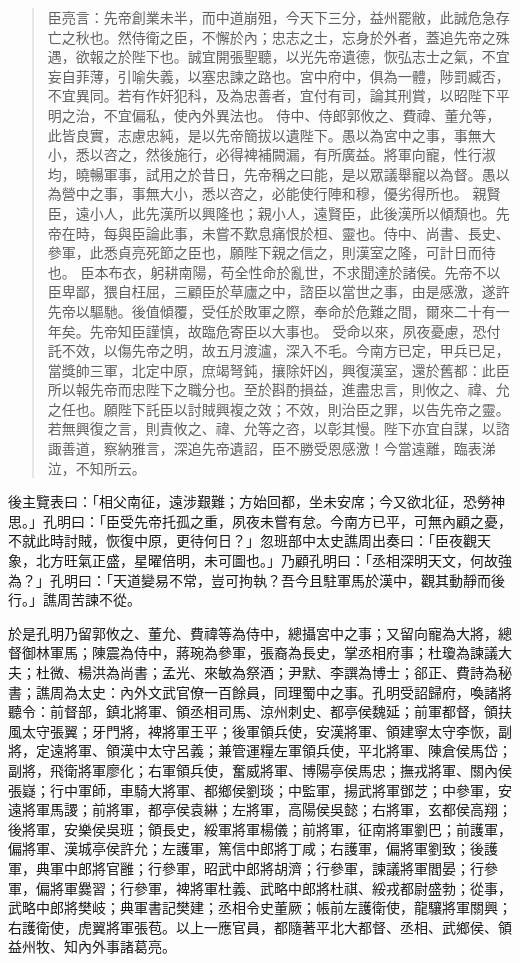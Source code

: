 \begin{quote}
臣亮言：先帝創業未半，而中道崩殂，今天下三分，益州罷敝，此誠危急存亡之秋也。然侍衛之臣，不懈於內；忠志之士，忘身於外者，蓋追先帝之殊遇，欲報之於陛下也。誠宜開張聖聽，以光先帝遺德，恢弘志士之氣，不宜妄自菲薄，引喻失義，以塞忠諫之路也。宮中府中，俱為一體，陟罰臧否，不宜異同。若有作奸犯科，及為忠善者，宜付有司，論其刑賞，以昭陛下平明之治，不宜偏私，使內外異法也。
侍中、侍郎郭攸之、費禕、董允等，此皆良實，志慮忠純，是以先帝簡拔以遺陛下。愚以為宮中之事，事無大小，悉以咨之，然後施行，必得裨補闕漏，有所廣益。將軍向寵，性行淑均，曉暢軍事，試用之於昔日，先帝稱之曰能，是以眾議舉寵以為督。愚以為營中之事，事無大小，悉以咨之，必能使行陣和穆，優劣得所也。
親賢臣，遠小人，此先漢所以興隆也；親小人，遠賢臣，此後漢所以傾頹也。先帝在時，每與臣論此事，未嘗不歎息痛恨於桓、靈也。侍中、尚書、長史、參軍，此悉貞亮死節之臣也，願陛下親之信之，則漢室之隆，可計日而待也。
臣本布衣，躬耕南陽，苟全性命於亂世，不求聞達於諸侯。先帝不以臣卑鄙，猥自枉屈，三顧臣於草廬之中，諮臣以當世之事，由是感激，遂許先帝以驅馳。後值傾覆，受任於敗軍之際，奉命於危難之間，爾來二十有一年矣。先帝知臣謹慎，故臨危寄臣以大事也。
受命以來，夙夜憂慮，恐付託不效，以傷先帝之明，故五月渡瀘，深入不毛。今南方已定，甲兵已足，當獎帥三軍，北定中原，庶竭弩鈍，攘除奸凶，興復漢室，還於舊都：此臣所以報先帝而忠陛下之職分也。至於斟酌損益，進盡忠言，則攸之、禕、允之任也。願陛下託臣以討賊興複之效；不效，則治臣之罪，以告先帝之靈。若無興復之言，則責攸之、禕、允等之咨，以彰其慢。陛下亦宜自謀，以諮諏善道，察納雅言，深追先帝遺詔，臣不勝受恩感激！今當遠離，臨表涕泣，不知所云。
\end{quote}

後主覽表曰：「相父南征，遠涉艱難；方始回都，坐未安席；今又欲北征，恐勞神思。」孔明曰：「臣受先帝托孤之重，夙夜未嘗有怠。今南方已平，可無內顧之憂，不就此時討賊，恢復中原，更待何日？」忽班部中太史譙周出奏曰：「臣夜觀天象，北方旺氣正盛，星曜倍明，未可圖也。」乃顧孔明曰：「丞相深明天文，何故強為？」孔明曰：「天道變易不常，豈可拘執？吾今且駐軍馬於漢中，觀其動靜而後行。」譙周苦諫不從。

於是孔明乃留郭攸之、董允、費禕等為侍中，總攝宮中之事；又留向寵為大將，總督御林軍馬；陳震為侍中，蔣琬為參軍，張裔為長史，掌丞相府事；杜瓊為諫議大夫；杜微、楊洪為尚書；孟光、來敏為祭酒；尹默、李譔為博士；郤正、費詩為秘書；譙周為太史：內外文武官僚一百餘員，同理蜀中之事。孔明受詔歸府，喚諸將聽令：前督部，鎮北將軍、領丞相司馬、涼州刺史、都亭侯魏延；前軍都督，領扶風太守張翼；牙門將，裨將軍王平；後軍領兵使，安漢將軍、領建寧太守李恢，副將，定遠將軍、領漢中太守呂義；兼管運糧左軍領兵使，平北將軍、陳倉侯馬岱；副將，飛衛將軍廖化；右軍領兵使，奮威將軍、博陽亭侯馬忠；撫戎將軍、關內侯張嶷；行中軍師，車騎大將軍、都鄉侯劉琰；中監軍，揚武將軍鄧芝；中參軍，安遠將軍馬謖；前將軍，都亭侯袁綝；左將軍，高陽侯吳懿；右將軍，玄都侯高翔；後將軍，安樂侯吳班；領長史，綏軍將軍楊儀；前將軍，征南將軍劉巴；前護軍，偏將軍、漢城亭侯許允；左護軍，篤信中郎將丁咸；右護軍，偏將軍劉致；後護軍，典軍中郎將官雝；行參軍，昭武中郎將胡濟；行參軍，諫議將軍閻晏；行參軍，偏將軍爨習；行參軍，裨將軍杜義、武略中郎將杜祺、綏戎都尉盛勃；從事，武略中郎將樊岐；典軍書記樊建；丞相令史董厥；帳前左護衛使，龍驤將軍關興；右護衛使，虎翼將軍張苞。以上一應官員，都隨著平北大都督、丞相、武鄉侯、領益州牧、知內外事諸葛亮。

